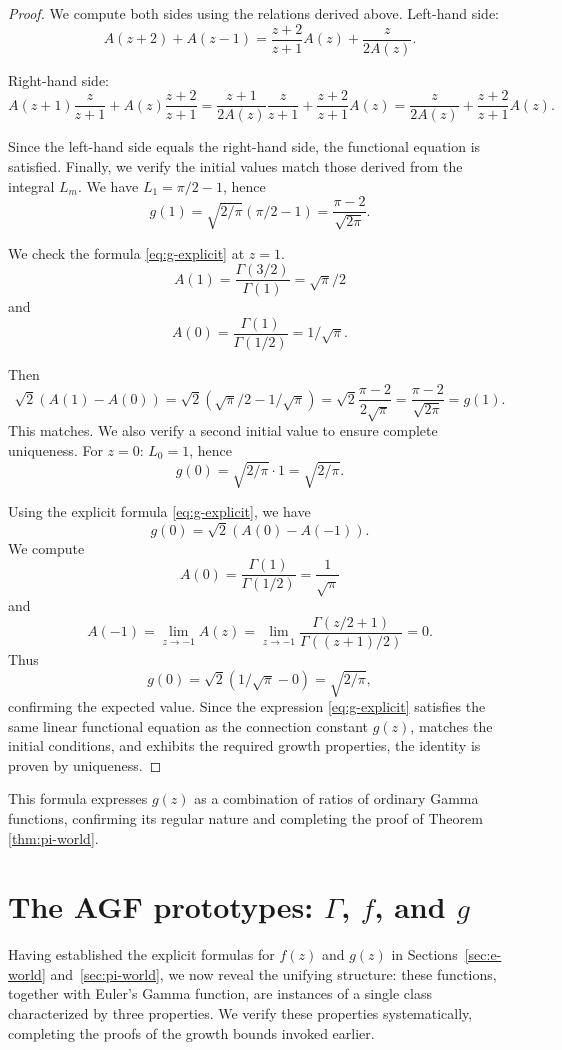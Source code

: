 \documentclass[11pt,reqno]{amsart}
\theoremstyle{definition}
\numberwithin{equation}{section}
\begin{document}
\begin{proof}
We compute both sides using the relations derived above. Left-hand side:
$$A(z+2)+A(z-1) = \frac{z+2}{z+1}A(z) + \frac{z}{2A(z)}.$$

Right-hand side:
$$A(z+1)\frac{z}{z+1} + A(z)\frac{z+2}{z+1} = \frac{z+1}{2A(z)}\frac{z}{z+1} + \frac{z+2}{z+1}A(z) = \frac{z}{2A(z)} + \frac{z+2}{z+1}A(z).$$

Since the left-hand side equals the right-hand side, the functional equation is satisfied. Finally, we verify the initial values match those derived from the integral $L_m$. We have $L_1 = \pi/2-1$, hence 
$$g(1) = \sqrt{2/\pi}(\pi/2-1) = \frac{\pi-2}{\sqrt{2\pi}}.$$

We check the formula \eqref{eq:g-explicit} at $z=1$. 
$$A(1) = \frac{\Gamma(3/2)}{\Gamma(1)} = \sqrt{\pi}/2$$ 
and 
$$A(0) = \frac{\Gamma(1)}{\Gamma(1/2)} = 1/\sqrt{\pi}.$$

Then 
$$ \sqrt{2}(A(1)-A(0)) = \sqrt{2}(\sqrt{\pi}/2 - 1/\sqrt{\pi}) = \sqrt{2}\frac{\pi-2}{2\sqrt{\pi}} = \frac{\pi-2}{\sqrt{2\pi}}=g(1).$$
This matches.  We also verify a second initial value to ensure complete uniqueness. For $z=0$: $L_0 = 1$, hence 
$$g(0) = \sqrt{2/\pi} \cdot 1 = \sqrt{2/\pi}.$$

Using the explicit formula \eqref{eq:g-explicit}, we have
$$g(0) = \sqrt{2}(A(0)-A(-1)).$$
We compute
$$A(0) = \frac{\Gamma(1)}{\Gamma(1/2)} = \frac{1}{\sqrt{\pi}}$$
and
$$A(-1) = \lim_{z \to -1} A(z) = \lim_{z \to -1} \frac{\Gamma(z/2+1)}{\Gamma((z+1)/2)} = 0.$$
Thus
$$g(0) = \sqrt{2}(1/\sqrt{\pi} - 0) = \sqrt{2/\pi},$$
confirming the expected value. Since the expression \eqref{eq:g-explicit} satisfies the same linear functional equation as the connection constant $g(z)$, matches the initial conditions, and exhibits the required growth properties, the identity is proven by uniqueness.
\end{proof}

This formula expresses $g(z)$ as a combination of ratios of ordinary Gamma functions, confirming its regular nature and completing the proof of Theorem \ref{thm:pi-world}.

\section{The AGF prototypes: $\Gamma$, $f$, and $g$}\label{sec:gamma-prototype}

Having established the explicit formulas for $f(z)$ and $g(z)$ in Sections~\ref{sec:e-world} and~\ref{sec:pi-world}, we now reveal the unifying structure: these functions, together with Euler's Gamma function, are instances of a single class characterized by three properties. We verify these properties systematically, completing the proofs of the growth bounds invoked earlier.
\end{document}

